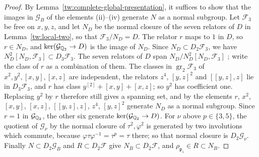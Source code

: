 \begin{proof}
By Lemma~\ref{tw:complete-global-presentation}, it suffices to show that the
images in $\mathcal G_B$ of the elements (ii)--(iv) generate $N$ as a normal
subgroup. Let $\mathcal F_3$ be free on $x,y,z$, and let $N_D$ be the normal
closure of the seven relators of $D$ in Lemma~\ref{tw:local-two}, so that
$\mathcal F_3/N_D=D$. The relator $r$ maps to $1$ in $D$, so $r\in N_D$, and
$\ker(\mathcal G_{\mathbb Q_2}\to D)$ is the image of $N_D$. Since
$N_D\subset D_2\mathcal F_3$, we have
$N_D^2[N_D,\mathcal F_3]\subset D_3\mathcal F_3$. The seven relators of $D$
span $N_D/N_D^2[N_D,\mathcal F_3]$
\cite[Corollary~3.9.3]{NeukirchSchmidtWingberg2008}; write the class of $r$ as
a combination of them. The classes in $\operatorname{gr}_2\mathcal F_3$ of
$x^2,y^2,[x,y],[x,z]$ are independent, the relators $z^4$, $[y,z]^2$ and
$[[y,z],z]$ lie in $D_3\mathcal F_3$, and $r$ has class
$y^{[2]}+[x,y]+[x,z]$; so $y^2$ has coefficient one. Replacing $y^2$ by $r$
therefore still gives a spanning set, and by
\cite[Corollary~3.9.3]{NeukirchSchmidtWingberg2008} the elements $r$, $x^2$,
$[x,y]$, $[x,z]$, $[[y,z],z]$, $z^4$, $[y,z]^2$ generate $N_D$ as a normal
subgroup. Since $r=1$ in $\mathcal G_{\mathbb Q_2}$, the other six generate
$\ker(\mathcal G_{\mathbb Q_2}\to D)$. For $\nu$ above $p\in\{3,5\}$, the quotient
of $\mathcal G_\nu$ by the normal closure of $\tau^2,\varphi^2$ is generated
by two involutions which commute, because
$\varphi\tau\varphi^{-1}=\tau^p=\tau$ there; so that normal closure is
$D_2\mathcal G_\nu$. Finally $N\subset D_2\mathcal G_B$ and
$R\subset D_2\mathcal F$ give $N_B\subset D_2\mathcal F$, and
$\rho_{\mathfrak p_1}\in R\subset N_B$.
\end{proof}

